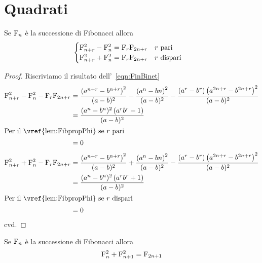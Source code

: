 \section{Quadrati}
\begin{thm}\label{thm:Fibsommsdifferenzaquadrati}
	Se $\mathrm{F}_{n}$ è la successione di Fibonacci allora
	\begin{equation}
		\begin{cases}
			\mathrm{F}_{n+r}^2-\mathrm{F}_{n}^2={}\mathrm{F}_{r}\mathrm{F}_{2n+r}\quad\text{$r$ pari}    \\
			\mathrm{F}_{n+r}^2+\mathrm{F}_{n}^2={}\mathrm{F}_{r}\mathrm{F}_{2n+r}\quad\text{$r$ dispari} \\
		\end{cases}
	\end{equation}
\end{thm}
\begin{proof}
	Riscriviamo il risultato dell'~\vref{eqn:FinBinet}
	\begin{align*}
		\Fib{n+r}^2-\Fib{n}^2-\Fib{r}\Fib{2n+r}
		={} & \dfrac{\left(a^{n+r}-b^{n+r}\right)^2}{(a-b)^2}
		-\dfrac{\left(a^{n}-b{n}\right)^2}{(a-b)^2}
		-\dfrac{(a^r-b^r)\left(a^{2n+r}-b^{2n+r}\right)^2}{(a-b)^2} \\
		={} & \dfrac{(a^n-b^n)^2\left(a^rb^r-1 \right)}{(a-b)^2}    \\
		\intertext{Per il~\vref{lem:FibpropPhi} se $r$ pari}
		={} & 0                                                     \\
	\end{align*}
	\begin{align*}
		\Fib{n+r}^2+\Fib{n}^2-\Fib{r}\Fib{2n+r}
		={} & \dfrac{\left(a^{n+r}-b^{n+r}\right)^2}{(a-b)^2}
		+\dfrac{\left(a^{n}-b{n}\right)^2}{(a-b)^2}
		-\dfrac{(a^r-b^r)\left(a^{2n+r}-b^{2n+r}\right)^2}{(a-b)^2} \\
		={} & \dfrac{(a^n-b^n)^2\left(a^rb^r+1 \right)}{(a-b)^2}    \\
		\intertext{Per il~\vref{lem:FibpropPhi} se $r$ dispari}
		={} & 0                                                     \\
	\end{align*}
	cvd.
\end{proof}
\begin{thm}\label{thm:Fibdispari}
	Se $\mathrm{F}_{n}$ è la successione di Fibonacci allora
	\begin{equation}
		\mathrm{F}_{n}^2+\mathrm{F}_{n+1}^2=\mathrm{F}_{2n+1}
	\end{equation}\label{eqn:FibDispari}
\end{thm}
